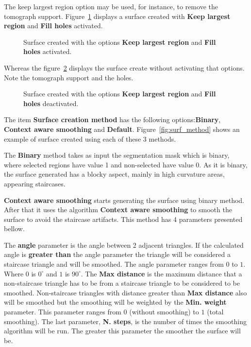 The keep largest region option may be used, for instance, to remove the tomograph support. Figure~\ref{fig:surface_ex1} displays a surface created with \textbf{Keep largest region} and \textbf{Fill holes} activated. 

\begin{figure}[!htb]
  \centering
  \caption{Surface created with the options \textbf{Keep largest region} and \textbf{Fill holes} activated.}
  \label{fig:surface_ex1}
\end{figure}

Whereas the figure~\ref{fig:surface_ex2} displays the surface create without activating that options. Note the tomograph support and the holes.

\begin{figure}
  \centering
  \caption{Surface created with the options \textbf{Keep largest region} and \textbf{Fill holes} deactivated.}
  \label{fig:surface_ex2}
\end{figure}

The item \textbf{Surface creation method} has the following options:\textbf{Binary}, \textbf{Context aware smoothing} and \textbf{Default}. Figure~\ref{fig:surf_method} shows an example of surface created using each of these 3 methods.

The \textbf{Binary} method takes as input the segmentation mask which is binary, where selected regions have value 1 and non-selected have value 0. As it is binary, the surface generated has a blocky aspect, mainly in high curvature areas, appearing staircases.

\textbf{Context aware smoothing} starts generating the surface using binary method. After that it uses the algorithm \textbf{Context aware smoothing} to smooth the surface to avoid the staircase artifacts. This method has 4 parameters presented bellow.

The \textbf{angle} parameter is the angle between 2 adjacent triangles. If the calculated angle is \textbf{greater than} the angle parameter the triangle will be considered a staircase triangle and will be smoothed. The angle parameter ranges from $0$ to $1$. Where $0$ is $0^\circ$  and $1$ is $90^\circ$. The \textbf{Max distance} is the maximum distance that a non-staircase triangle has to be from a staircase triangle to be considered to be smoothed. Non-staircase triangles with distance greater than \textbf{Max distance} also will be smoothed but the smoothing will be weighted by the \textbf{Min. weight} parameter. This parameter ranges from $0$ (without smoothing) to $1$ (total smoothing). The last parameter, \textbf{N. steps}, is the number of times the smoothing algorithm will be run. The greater this parameter the smoother the surface will be.

